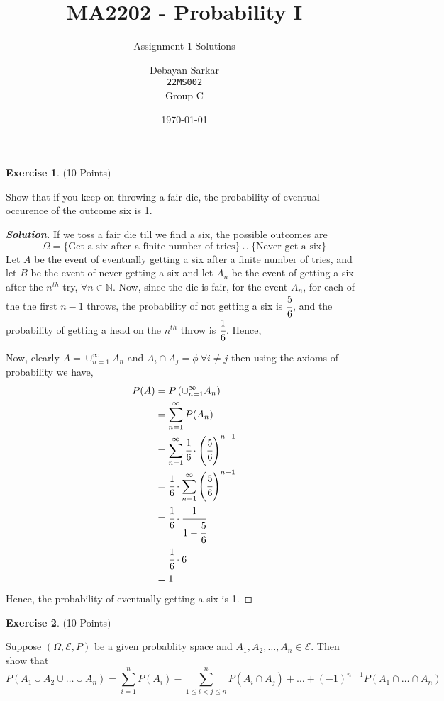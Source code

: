 \documentclass[10pt]{scrartcl}
\title{MA2202 - Probability I}
\subtitle{Assignment 1 Solutions}
\author{Debayan Sarkar \\ \texttt{22MS002} \\ Group C}
\date{\today}
\theoremstyle{definition}
\newtheorem{exercise}{Exercise}
\newenvironment{solution} {\begin{proof}[\normalfont \textbf{Solution}]} {\end{proof}}
\newcommand{\nn}{\mathbb{N}}
\begin{document}
\maketitle
\begin{exercise}(10 Points)

    Show that if you keep on throwing a fair die, the probability of eventual occurence of the outcome six is 1.
\end{exercise}
\begin{solution}
    If we toss a fair die till we find a six, the possible outcomes are $$\Omega = \{\text{Get a six after a finite number of tries} \} \cup \{ \text{Never get a six} \}$$
    Let $A$ be the event of eventually getting a six after a finite number of tries, and let $B$ be the event of never getting a six
    and let $A_n$ be the event of getting a six after the $n^{th}$ try, $\forall n\in \nn$. Now, since the die is fair, for the event 
    $A_n$, for each of the the first $n-1$ throws, the probability of not getting a six is $\cfrac{5}{6}$, and the probability of getting a head
    on the $n^{th}$ throw is $\cfrac{1}{6}$. Hence, 

    Now, clearly $A = \cup_{n=1}^{\infty}A_n$ and $A_i \cap A_j = \phi ~ \forall i \neq j$ then using the axioms of probability we have, 
    \begin{align*}
        P(A) &= P\left(\cup_{n=1}^{\infty} A_n\right) \\ 
             &= \sum_{n=1}^{\infty} P(A_n) \\ 
             &= \sum_{n = 1}^{\infty} \cfrac{1}{6} \cdot \left(\cfrac{5}{6}\right)^{n-1} \\ 
             &= \cfrac{1}{6}\cdot \sum_{n = 1}^{\infty} \left(\cfrac{5}{6}\right)^{n-1} \\ 
             &= \cfrac{1}{6} \cdot \cfrac{1}{1- \cfrac{5}{6}} \\ 
             &= \cfrac{1}{6}\cdot 6 \\ 
             &= 1
    \end{align*}
    Hence, the probability of eventually getting a six is 1.
\end{solution}
\clearpage
\begin{exercise}(10 Points)

    Suppose $(\Omega, \mathcal{E}, P)$ be a given probablity space and $A_1, A_2, \dots ,A_n \in \mathcal{E}$. Then show that 
    $$P(A_1 \cup A_2 \cup \dots \cup A_n) = \sum_{i=1}^{n}P(A_i) - \sum_{1\leq i < j\leq n}^{n}P(A_i \cap A_j) + \dots + (-1)^{n - 1}P(A_1 \cap \dots \cap A_n)$$
\end{exercise}
\end{document}
